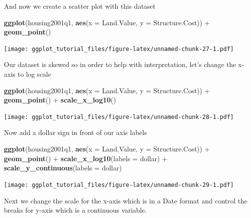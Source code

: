 \documentclass[]{article}
\newenvironment{Shaded}{\begin{snugshade}}{\end{snugshade}}
\newcommand{\KeywordTok}[1]{\textcolor[rgb]{0.13,0.29,0.53}{\textbf{{#1}}}}
\newcommand{\DataTypeTok}[1]{\textcolor[rgb]{0.13,0.29,0.53}{{#1}}}
\newcommand{\StringTok}[1]{\textcolor[rgb]{0.31,0.60,0.02}{{#1}}}
\newcommand{\NormalTok}[1]{{#1}}
\theoremstyle{definition}
\theoremstyle{definition}
\theoremstyle{definition}
\theoremstyle{remark}
\begin{document}
And now we create a scatter plot with this dataset

\begin{Shaded}
\begin{Highlighting}[]
\KeywordTok{ggplot}\NormalTok{(housing2001q1, }\KeywordTok{aes}\NormalTok{(}\DataTypeTok{x =} \NormalTok{Land.Value, }\DataTypeTok{y =} \NormalTok{Structure.Cost)) +}\StringTok{ }
\StringTok{  }\KeywordTok{geom_point}\NormalTok{()}
\end{Highlighting}
\end{Shaded}

\texttt{[image: ggplot\_tutorial\_files/figure-latex/unnamed-chunk-27-1.pdf]}

Our dataset is skewed so in order to help with interpretation, let's
change the x-axis to log scale

\begin{Shaded}
\begin{Highlighting}[]
\KeywordTok{ggplot}\NormalTok{(housing2001q1, }\KeywordTok{aes}\NormalTok{(}\DataTypeTok{x =} \NormalTok{Land.Value, }\DataTypeTok{y =} \NormalTok{Structure.Cost)) +}\StringTok{ }
\StringTok{  }\KeywordTok{geom_point}\NormalTok{() +}\StringTok{ }
\StringTok{  }\KeywordTok{scale_x_log10}\NormalTok{()}
\end{Highlighting}
\end{Shaded}

\texttt{[image: ggplot\_tutorial\_files/figure-latex/unnamed-chunk-28-1.pdf]}

Now add a dollar sign in front of our axis labels

\begin{Shaded}
\begin{Highlighting}[]
\KeywordTok{ggplot}\NormalTok{(housing2001q1, }\KeywordTok{aes}\NormalTok{(}\DataTypeTok{x =} \NormalTok{Land.Value, }\DataTypeTok{y =} \NormalTok{Structure.Cost)) +}\StringTok{ }
\StringTok{  }\KeywordTok{geom_point}\NormalTok{() +}\StringTok{ }
\StringTok{  }\KeywordTok{scale_x_log10}\NormalTok{(}\DataTypeTok{labels =} \NormalTok{dollar) +}
\StringTok{  }\KeywordTok{scale_y_continuous}\NormalTok{(}\DataTypeTok{labels =} \NormalTok{dollar)}
\end{Highlighting}
\end{Shaded}

\texttt{[image: ggplot\_tutorial\_files/figure-latex/unnamed-chunk-29-1.pdf]}

Next we change the scale for the x-axis which is in a Date format and
control the breaks for y-axis which is a continuous variable.
\end{document}
